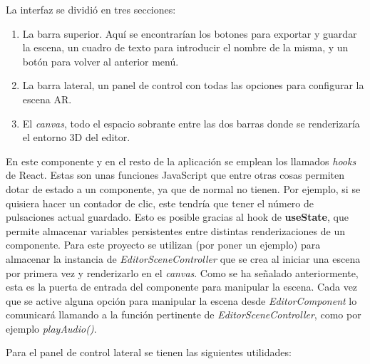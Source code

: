 La interfaz se dividió en tres secciones:

\begin{enumerate}
    \item La barra superior. Aquí se encontrarían los botones para exportar y guardar la escena, un cuadro de texto para introducir el nombre de la misma, y un botón para volver al anterior menú.
    \item La barra lateral, un panel de control con todas las opciones para configurar la escena AR.
    \item El \textit{canvas}, todo el espacio sobrante entre las dos barras donde se renderizaría el entorno 3D del editor.
\end{enumerate}

En este componente y en el resto de la aplicación se emplean los llamados \textit{hooks} de React. Estas son unas funciones JavaScript que entre otras cosas permiten dotar de estado a un componente, ya que de normal no tienen. Por ejemplo, si se quisiera hacer un contador de clic, este tendría que tener el número de pulsaciones actual guardado. Esto es posible gracias al hook de \textbf{useState}, que permite almacenar variables persistentes entre distintas renderizaciones de un componente. Para este proyecto se utilizan (por poner un ejemplo) para almacenar la instancia de \textit{EditorSceneController} que se crea al iniciar una escena por primera vez y renderizarlo en el \textit{canvas}. Como se ha señalado anteriormente, esta es la puerta de entrada del componente para manipular la escena. Cada vez que se active alguna opción para manipular la escena desde \textit{EditorComponent} lo comunicará llamando a la función pertinente de \textit{EditorSceneController}, como por ejemplo \textit{playAudio()}.

Para el panel de control lateral se tienen las siguientes utilidades:

